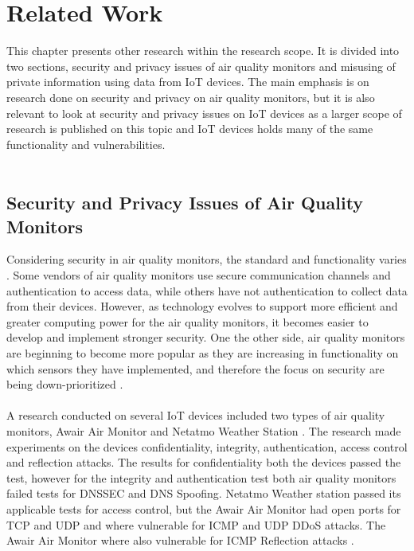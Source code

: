 \chapter{Related Work}
This chapter presents other research within the research scope. It is divided into two sections, security and privacy issues of air quality monitors and misusing of private information using data from IoT devices. The main emphasis is on research done on security and privacy on air quality monitors, but it is also relevant to look at security and privacy issues on IoT devices as a larger scope of research is published on this topic and IoT devices holds many of the same functionality and vulnerabilities.\\\\
\section{Security and Privacy Issues of Air Quality Monitors}
Considering security in air quality monitors, the standard and functionality varies \cite{AQMHowFarFunctionality}. Some vendors of air quality monitors use secure communication channels and authentication to access data, while others have not authentication to collect data from their devices. However, as technology evolves to support more efficient and greater computing power for the air quality monitors, it becomes easier to develop and implement stronger security. One the other side, air quality monitors are beginning to become more popular as they are increasing in functionality on which sensors they have implemented, and therefore the focus on security are being down-prioritized \cite{SecurityAndDataIntInAQM}.
\\\\ 
A research conducted on several IoT devices included two types of air quality monitors, Awair Air Monitor and Netatmo Weather Station \cite{IoTSecurityandPrivacyImpl}. The research made experiments on the devices confidentiality, integrity, authentication, access control and reflection attacks. The results for confidentiality both the devices passed the test, however for the integrity and authentication test both air quality monitors failed tests for DNSSEC and DNS Spoofing. Netatmo Weather station passed its applicable tests for access control, but the Awair Air Monitor had open ports for TCP and UDP and where vulnerable for ICMP and UDP DDoS attacks. The Awair Air Monitor where also vulnerable for ICMP Reflection attacks \cite{IoTSecurityandPrivacyImpl}.
\\\\
